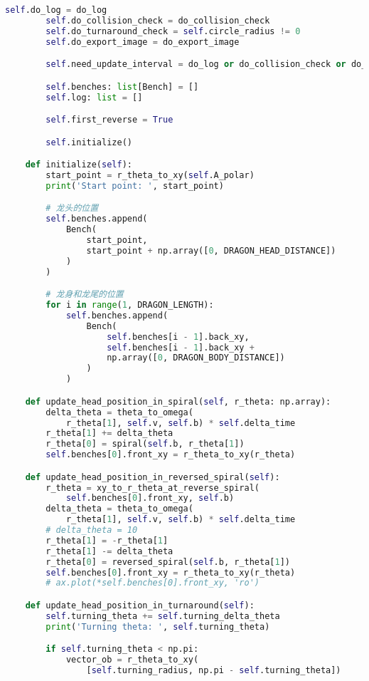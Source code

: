 \begin{lstlisting}[language=python]
        self.do_log = do_log
        self.do_collision_check = do_collision_check
        self.do_turnaround_check = self.circle_radius != 0
        self.do_export_image = do_export_image

        self.need_update_interval = do_log or do_collision_check or do_export_image

        self.benches: list[Bench] = []
        self.log: list = []

        self.first_reverse = True

        self.initialize()

    def initialize(self):
        start_point = r_theta_to_xy(self.A_polar)
        print('Start point: ', start_point)

        # 龙头的位置
        self.benches.append(
            Bench(
                start_point,
                start_point + np.array([0, DRAGON_HEAD_DISTANCE])
            )
        )

        # 龙身和龙尾的位置
        for i in range(1, DRAGON_LENGTH):
            self.benches.append(
                Bench(
                    self.benches[i - 1].back_xy,
                    self.benches[i - 1].back_xy +
                    np.array([0, DRAGON_BODY_DISTANCE])
                )
            )

    def update_head_position_in_spiral(self, r_theta: np.array):
        delta_theta = theta_to_omega(
            r_theta[1], self.v, self.b) * self.delta_time
        r_theta[1] += delta_theta
        r_theta[0] = spiral(self.b, r_theta[1])
        self.benches[0].front_xy = r_theta_to_xy(r_theta)

    def update_head_position_in_reversed_spiral(self):
        r_theta = xy_to_r_theta_at_reverse_spiral(
            self.benches[0].front_xy, self.b)
        delta_theta = theta_to_omega(
            r_theta[1], self.v, self.b) * self.delta_time
        # delta_theta = 10
        r_theta[1] = -r_theta[1]
        r_theta[1] -= delta_theta
        r_theta[0] = reversed_spiral(self.b, r_theta[1])
        self.benches[0].front_xy = r_theta_to_xy(r_theta)
        # ax.plot(*self.benches[0].front_xy, 'ro')

    def update_head_position_in_turnaround(self):
        self.turning_theta += self.turning_delta_theta
        print('Turning theta: ', self.turning_theta)

        if self.turning_theta < np.pi:
            vector_ob = r_theta_to_xy(
                [self.turning_radius, np.pi - self.turning_theta])


\end{lstlisting}
